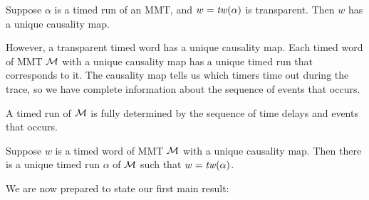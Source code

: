\begin{lemma}
\label{lemma unique causality map}
Suppose $\alpha$ is a timed run of an MMT, and $w =  \mathit{tw}(\alpha)$ is transparent. 
Then $w$ has a unique causality map.
\end{lemma}
\else
However, a transparent timed word has a unique causality map.
\fi
Each timed word of MMT ${\mathcal M}$ with a unique causality map has a unique timed run that corresponds to it.
The causality map tells us which timers time out during the trace, so we have complete information
about the sequence of events that occurs. 

\iflong
A timed run of ${\mathcal M}$ is fully determined
by the sequence of time delays and events that occurs.

\begin{lemma}
\label{lemma unique timed run}
Suppose $w$ is a timed word of MMT ${\mathcal M}$ with a unique causality map.
Then there is a unique timed run $\alpha$ of ${\mathcal M}$ such that $w = \mathit{tw}(\alpha)$.
\end{lemma}
\fi

We are now prepared to state our first main result:

